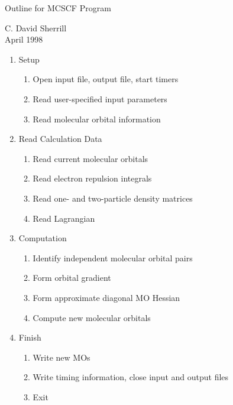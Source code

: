 \documentclass[12pt]{article}
\begin{document}
\def\ket#1{| #1 \rangle}
\def\bra#1{\langle #1 |}
\def\spinor#1{\chi_{#1}}
\def\creat#1{a_{#1}^{\dagger}}
\def\annih#1{a_{#1}}
\def\oeip#1#2{\langle #1 | h | #2 \rangle}
\def\teip#1#2{\langle #1 | #2 \rangle}
\def\teia#1#2{\langle #1 || #2 \rangle}
\def\oeic#1#2{[#1 | h | #2]}
\def\teic#1#2{[#1 | #2]}
\def\oei#1#2{(#1 | h | #2)}
\def\tei#1#2{(#1 | #2)}


\begin{center}
\begin{Large}
\begin{bf}
Outline for MCSCF Program
\end{bf}
\end{Large}

\vspace{0.1in}
C. David Sherrill \\
April 1998
\end{center}


\begin{enumerate}
  \item Setup
    \begin{enumerate}
      \item Open input file, output file, start timers
      \item Read user-specified input parameters
      \item Read molecular orbital information
    \end{enumerate}
  \item Read Calculation Data
    \begin{enumerate}
      \item Read current molecular orbitals
      \item Read electron repulsion integrals
      \item Read one- and two-particle density matrices
      \item Read Lagrangian
    \end{enumerate}
  \item Computation
    \begin{enumerate}
      \item Identify independent molecular orbital pairs 
      \item Form orbital gradient
      \item Form approximate diagonal MO Hessian
      \item Compute new molecular orbitals
    \end{enumerate}
  \item Finish
    \begin{enumerate}
      \item Write new MOs
      \item Write timing information, close input and output files
      \item Exit
    \end{enumerate}
\end{enumerate}
\end{document}
